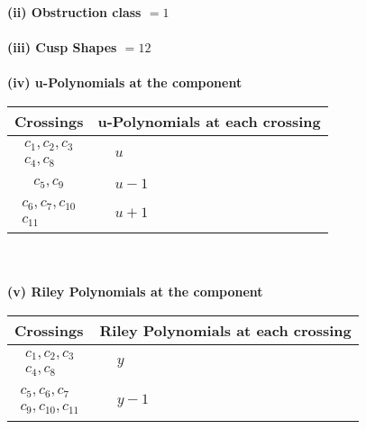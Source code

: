 \documentclass[1p]{elsarticle_modified}
\theoremstyle{definition}
\begin{document}
\flushleft \textbf{(ii) Obstruction class $= 1$}\\~\\
\flushleft \textbf{(iii) Cusp Shapes $= 12$}\\~\\
\newpage\renewcommand{\arraystretch}{1}
\flushleft \textbf{(iv) u-Polynomials at the component}\newline \\
\begin{tabular}{m{50pt}|m{274pt}}
Crossings & \hspace{64pt}u-Polynomials at each crossing \\
\hline $$\begin{aligned}c_{1},c_{2},c_{3}\\c_{4},c_{8}\end{aligned}$$&$\begin{aligned}
&u
\end{aligned}$\\
\hline $$\begin{aligned}c_{5},c_{9}\end{aligned}$$&$\begin{aligned}
&u-1
\end{aligned}$\\
\hline $$\begin{aligned}c_{6},c_{7},c_{10}\\c_{11}\end{aligned}$$&$\begin{aligned}
&u+1
\end{aligned}$\\
\hline
\end{tabular}\\~\\
\newpage\renewcommand{\arraystretch}{1}
\flushleft \textbf{(v) Riley Polynomials at the component}\newline \\
\begin{tabular}{m{50pt}|m{274pt}}
Crossings & \hspace{64pt}Riley Polynomials at each crossing \\
\hline $$\begin{aligned}c_{1},c_{2},c_{3}\\c_{4},c_{8}\end{aligned}$$&$\begin{aligned}
&y
\end{aligned}$\\
\hline $$\begin{aligned}c_{5},c_{6},c_{7}\\c_{9},c_{10},c_{11}\end{aligned}$$&$\begin{aligned}
&y-1
\end{aligned}$\\
\hline
\end{tabular}\\~\\
\end{document}
